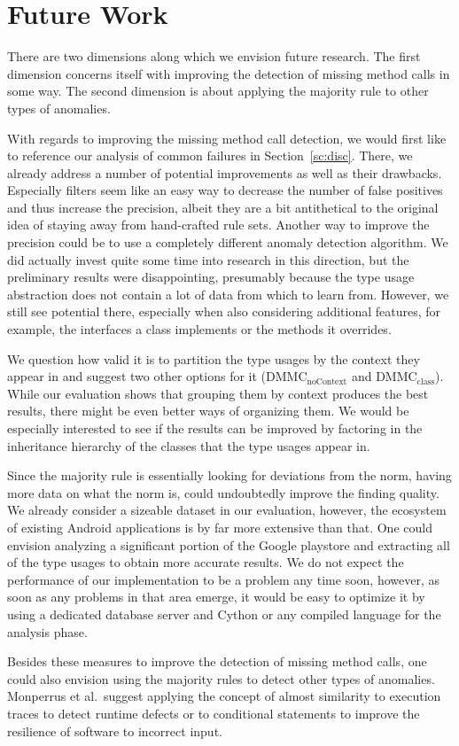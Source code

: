 \section{Future Work}

There are two dimensions along which we envision future research.
The first dimension concerns itself with improving the detection of missing method calls in some way.
The second dimension is about applying the majority rule to other types of anomalies.

With regards to improving the missing method call detection, we would first like to reference our analysis of common failures in Section~\ref{sc:disc}.
There, we already address a number of potential improvements as well as their drawbacks.
Especially filters seem like an easy way to decrease the number of false positives and thus increase the precision, albeit they are a bit antithetical to the original idea of staying away from hand-crafted rule sets.
Another way to improve the precision could be to use a completely different anomaly detection algorithm.
We did actually invest quite some time into research in this direction, but the preliminary results were disappointing, presumably because the type usage abstraction does not contain a lot of data from which to learn from.
However, we still see potential there, especially when also considering additional features, for example, the interfaces a class implements or the methods it overrides.

We question how valid it is to partition the type usages by the context they appear in and suggest two other options for it ($\text{DMMC}_\text{noContext}$ and $\text{DMMC}_\text{class}$).
While our evaluation shows that grouping them by context produces the best results, there might be even better ways of organizing them.
We would be especially interested to see if the results can be improved by factoring in the inheritance hierarchy of the classes that the type usages appear in.

Since the majority rule is essentially looking for deviations from the norm, having more data on what the norm is, could undoubtedly improve the finding quality.
We already consider a sizeable dataset in our evaluation, however, the ecosystem of existing Android applications is by far more extensive than that.
One could envision analyzing a significant portion of the Google playstore and extracting all of the type usages to obtain more accurate results.
We do not expect the performance of our implementation to be a problem any time soon, however, as soon as any problems in that area emerge, it would be easy to optimize it by using a dedicated database server and Cython or any compiled language for the analysis phase.

Besides these measures to improve the detection of missing method calls, one could also envision using the majority rules to detect other types of anomalies.
Monperrus et al.\ suggest applying the concept of almost similarity to execution traces to detect runtime defects or to conditional statements to improve the resilience of software to incorrect input.

